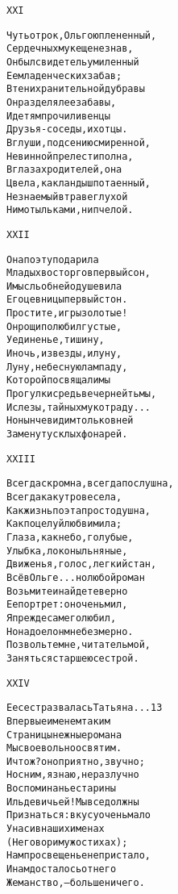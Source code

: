 \begin{minipage}[t]{\dimexpr 0.5\textwidth -\tabcolsep-.5pt}
\begin{alltt}\normalfont\centering
XXI

Чуть отрок, Ольгою плененный,
Сердечных мук еще не знав,
Он был свидетель умиленный
Ее младенческих забав;
В тени хранительной дубравы
Он разделял ее забавы,
И детям прочили венцы
Друзья-соседы, их отцы.
В глуши, под сению смиренной,
Невинной прелести полна,
В глазах родителей, она
Цвела, как ландыш потаенный,
Незнаемый в траве глухой
Ни мотыльками, ни пчелой.
\end{alltt}
\end{minipage}

\begin{minipage}[t]{\dimexpr 0.5\textwidth -\tabcolsep-.5pt}
\begin{alltt}\normalfont\centering
XXII

Она поэту подарила
Младых восторгов первый сон,
И мысль об ней одушевила
Его цевницы первый стон.
Простите, игры золотые!
Он рощи полюбил густые,
Уединенье, тишину,
И ночь, и звезды, и луну,
Луну, небесную лампаду,
Которой посвящали мы
Прогулки средь вечерней тьмы,
И слезы, тайных мук отраду...
Но нынче видим только в ней
Замену тусклых фонарей.
\end{alltt}
\end{minipage}
\clearpage

\begin{minipage}[t]{\dimexpr 0.5\textwidth -\tabcolsep-.5pt}
\begin{alltt}\normalfont\centering
XXIII

Всегда скромна, всегда послушна,
Всегда как утро весела,
Как жизнь поэта простодушна,
Как поцелуй любви мила;
Глаза, как небо, голубые,
Улыбка, локоны льняные,
Движенья, голос, легкий стан,
Всё в Ольге... но любой роман
Возьмите и найдете верно
Ее портрет: он очень мил,
Я прежде сам его любил,
Но надоел он мне безмерно.
Позвольте мне, читатель мой,
Заняться старшею сестрой.
\end{alltt}
\end{minipage}

\begin{minipage}[t]{\dimexpr 0.5\textwidth -\tabcolsep-.5pt}
\begin{alltt}\normalfont\centering
XXIV

Ее сестра звалась Татьяна... 13
Впервые именем таким
Страницы нежные романа
Мы своевольно освятим.
И что ж? оно приятно, звучно;
Но с ним, я знаю, неразлучно
Воспоминанье старины
Иль девичьей! Мы все должны
Признаться: вкусу очень мало
У нас и в наших именах
(Не говорим уж о стихах);
Нам просвещенье не пристало,
И нам досталось от него
Жеманство, — больше ничего.
\end{alltt}
\end{minipage}
\clearpage

